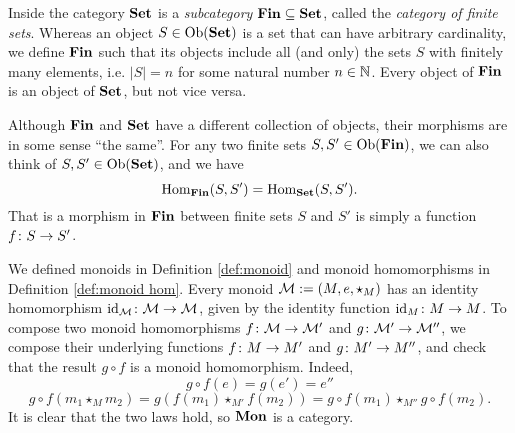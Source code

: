 \documentclass[CT4S-EN-RU]{subfiles}
\begin{document}
\begin{exampleRUS}
\end{exampleRUS}

\begin{exampleENG}\label{ex:Fin}
Inside the category ${\bf Set}$ is a {\em subcategory} ${\bf Fin}\subseteq{\bf Set}$, called the {\em category of finite sets}. Whereas an object $S\in\textnormal{Ob}({\bf Set})$ is a set that can have arbitrary cardinality, we define ${\bf Fin}$ such that its objects include all (and only) the sets $S$ with finitely many elements, i.e. $|S|=n$ for some natural number $n\in{\mathbb N}$. Every object of ${\bf Fin}$ is an object of ${\bf Set}$, but not vice versa.

Although ${\bf Fin}$ and ${\bf Set}$ have a different collection of objects, their morphisms are in some sense “the same”. For any two finite sets $S,S'\in\textnormal{Ob}({\bf Fin})$, we can also think of $S,S'\in\textnormal{Ob}({\bf Set})$, and we have
$$\textnormal{Hom}_{\bf Fin}(S,S')=\textnormal{Hom}_{\bf Set}(S,S').$$
That is a morphism in ${\bf Fin}$ between finite sets $S$ and $S'$ is simply a function $f\colon S\rightarrow S'$.
\end{exampleENG}

\begin{exampleRUS}\label{ex:Fin}
\end{exampleRUS}

\begin{exampleENG}\label{ex:mon is cat}
We defined monoids in Definition \ref{def:monoid} and monoid homomorphisms in Definition \ref{def:monoid hom}. Every monoid $\mathcal{M}:=(M,e,\star_M)$ has an identity homomorphism $\textnormal{id}_\mathcal{M}\colon\mathcal{M}\rightarrow\mathcal{M}$, given by the identity function $\textnormal{id}_M\colon M\rightarrow M$. To compose two monoid homomorphisms $f\colon\mathcal{M}\rightarrow\mathcal{M}'$ and $g\colon\mathcal{M}'\rightarrow\mathcal{M}''$, we compose their underlying functions $f\colon M\rightarrow M'$ and $g\colon M'\rightarrow M''$, and check that the result $g\circ f$ is a monoid homomorphism. Indeed,
$$g\circ f(e)=g(e')=e''$$
$$g\circ f(m_1\star_Mm_2)=g(f(m_1)\star_{M'}f(m_2))=g\circ f(m_1)\star_{M''}g\circ f(m_2).$$
It is clear that the two laws hold, so ${\bf Mon}$ is a category.
\end{exampleENG}

\begin{exampleRUS}\label{ex:mon is cat}
\end{exampleRUS}
\end{document}
